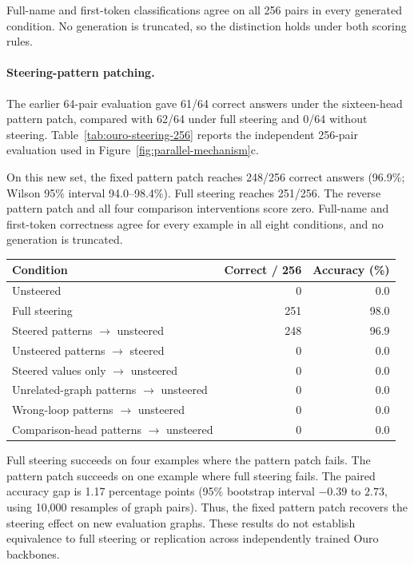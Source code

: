 \documentclass{article}
\begin{document}
Full-name and first-token classifications agree on all 256 pairs in every generated condition. No generation is truncated, so the distinction holds under both scoring rules.

\paragraph{Steering-pattern patching.}
The earlier 64-pair evaluation gave 61/64 correct answers under the sixteen-head pattern patch, compared with 62/64 under full steering and 0/64 without steering. Table~\ref{tab:ouro-steering-256} reports the independent 256-pair evaluation used in Figure~\ref{fig:parallel-mechanism}c.

On this new set, the fixed pattern patch reaches 248/256 correct answers (96.9\%; Wilson 95\% interval 94.0--98.4\%). Full steering reaches 251/256. The reverse pattern patch and all four comparison interventions score zero. Full-name and first-token correctness agree for every example in all eight conditions, and no generation is truncated.

\begin{center}
\begin{minipage}{\linewidth}
\centering
\captionsetup{hypcap=false}
\label{tab:ouro-steering-256}
\begin{tabular}{@{}lrr@{}}\toprule
Condition & Correct / 256 & Accuracy (\%)\\\midrule
Unsteered & 0 & 0.0 \\
Full steering & 251 & 98.0 \\
Steered patterns $\to$ unsteered & 248 & 96.9 \\
Unsteered patterns $\to$ steered & 0 & 0.0 \\
Steered values only $\to$ unsteered & 0 & 0.0 \\
Unrelated-graph patterns $\to$ unsteered & 0 & 0.0 \\
Wrong-loop patterns $\to$ unsteered & 0 & 0.0 \\
Comparison-head patterns $\to$ unsteered & 0 & 0.0 \\
\bottomrule\end{tabular}
\end{minipage}
\end{center}

Full steering succeeds on four examples where the pattern patch fails. The pattern patch succeeds on one example where full steering fails. The paired accuracy gap is 1.17 percentage points (95\% bootstrap interval $-0.39$ to $2.73$, using 10,000 resamples of graph pairs). Thus, the fixed pattern patch recovers the steering effect on new evaluation graphs. These results do not establish equivalence to full steering or replication across independently trained Ouro backbones.
\end{document}

